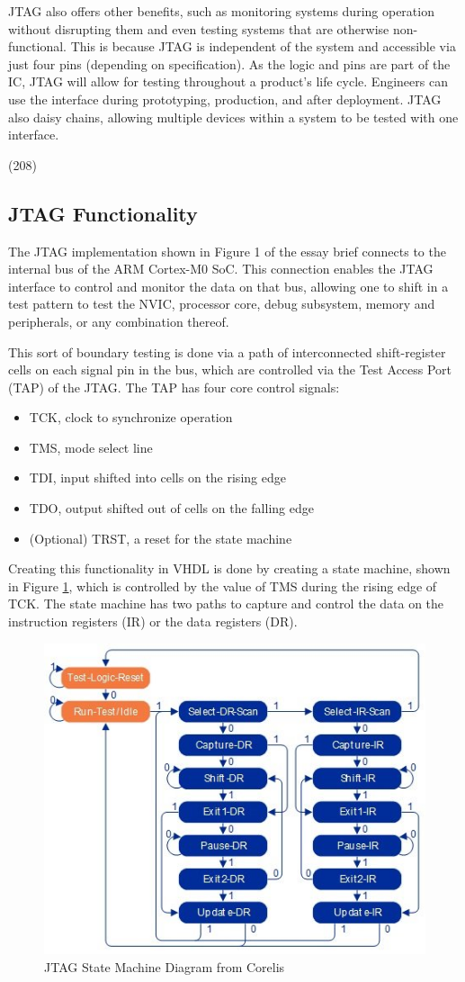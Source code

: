 \documentclass[11pt]{article}
\begin{document}
JTAG also offers other benefits, such as monitoring systems during operation without disrupting them and even testing systems that are otherwise non-functional\cite{Corelis}.
This is because JTAG is independent of the system and accessible via just four pins (depending on specification).
As the logic and pins are part of the IC, JTAG will allow for testing throughout a product's life cycle.
Engineers can use the interface during prototyping, production, and after deployment\cite{Corelis}.
JTAG also daisy chains, allowing multiple devices within a system to be tested with one interface.

(208)


\subsection{JTAG Functionality}
The JTAG implementation shown in Figure 1 of the essay brief connects to the internal bus of the ARM Cortex-M0 SoC.
This connection enables the JTAG interface to control and monitor the data on that bus, allowing one to shift in a test pattern to test
the NVIC, processor core, debug subsystem, memory and peripherals, or any combination thereof. 

This sort of boundary testing is done via a path of interconnected shift-register cells on each signal pin in the bus, which are controlled via the Test Access Port (TAP) of the JTAG.
The TAP has four core control signals\cite{jtag}:
\begin{itemize}
    \item TCK, clock to synchronize operation
    \item TMS, mode select line
    \item TDI, input shifted into cells on the rising edge
    \item TDO, output shifted out of cells on the falling edge 
    \item (Optional) TRST, a reset for the state machine 
\end{itemize}

Creating this functionality in VHDL is done by creating a state machine, shown in Figure \ref{fig:sm}, which is controlled by the value of TMS during the rising edge of TCK.
The state machine has two paths to capture and control the data on the instruction registers (IR) or the data registers (DR).

\begin{figure}[H]        
    \centering
    \includegraphics[width=.5\textwidth]{JTAG-state-machine-diagram1.jpg}
    \caption{JTAG State Machine Diagram from Corelis\cite{Corelis}}
    \label{fig:sm}
\end{figure} 
\end{document}
